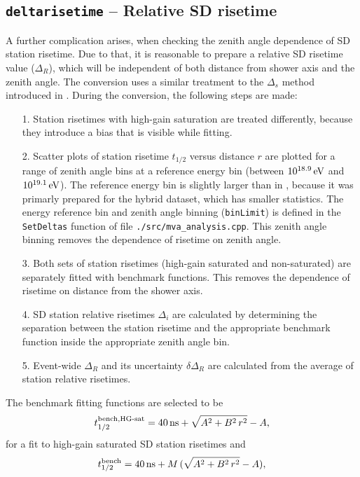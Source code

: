 \documentclass[12pt,a4paper]{report}
\begin{document}
\subsection{\texttt{deltarisetime} -- Relative SD risetime}
A further complication arises, when checking the zenith angle dependence of SD station risetime. Due to that, it is reasonable to prepare a relative SD risetime value ($\Delta_R$), which will be independent of both distance from shower axis and the zenith angle.
The conversion uses a similar treatment to the $\Delta_s$ method introduced in \cite{deltaMethod}. During the conversion, the following steps are made:
\begin{itemize}
\item[1.] Station risetimes with high-gain saturation are treated differently, because they introduce a bias that is visible while fitting.
\item[2.] Scatter plots of station risetime $t_{1/2}$ versus distance $r$ are plotted for a range of zenith angle bins at a reference energy bin (between $\unit[10^{18.9}]{eV}$ and $\unit[10^{19.1}]{eV}$). The reference energy bin is slightly larger than in \cite{deltaMethod}, because it was primarly prepared for the hybrid dataset, which has smaller statistics. The energy reference bin and zenith angle binning (\texttt{binLimit}) is defined in the \texttt{SetDeltas} function of file \texttt{./src/mva\_analysis.cpp}. This zenith angle binning removes the dependence of risetime on zenith angle.
\item[3.] Both sets of station risetimes (high-gain saturated and non-saturated) are separately fitted with benchmark functions. This removes the dependence of risetime on distance from the shower axis.
\item[4.] SD station relative risetimes $\Delta_i$ are calculated by determining the separation between the station risetime and the appropriate benchmark function inside the appropriate zenith angle bin.
\item[5.] Event-wide $\Delta_R$ and its uncertainty $\delta \Delta_R$ are calculated from the average of station relative risetimes.
\end{itemize}
The benchmark fitting functions are selected to be
\begin{equation}\label{eq:HGbench}
t_{1/2}^{\textrm{bench},\textrm{HG-sat}} = \unit[40]{ns} + \sqrt{A^2 + B^2\, r^2} - A,
\end{equation}
for a fit to high-gain saturated SD station risetimes and
\begin{equation}\label{eq:normalbench}
t_{1/2}^{\textrm{bench}} = \unit[40]{ns} + M\, (\sqrt{A^2 + B^2\, r^2} - A),
\end{equation}
\end{document}
